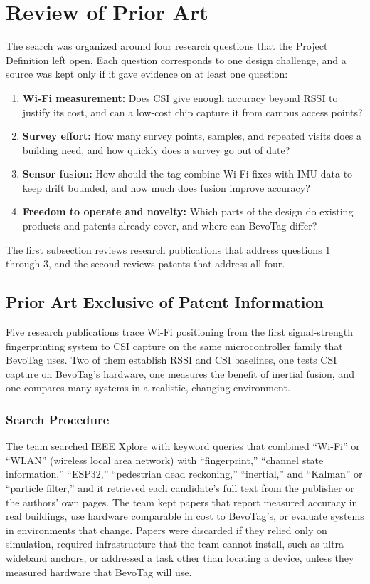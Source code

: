\documentclass[12pt,letterpaper]{article}
\begin{document}
\section{Review of Prior Art}
The search was organized around four research questions that the Project Definition left open.
Each question corresponds to one design challenge, and a source was kept only if it gave evidence
on at least one question:
\begin{enumerate}
  \item \textbf{Wi-Fi measurement:} Does CSI give enough accuracy beyond RSSI to justify its cost,
    and can a low-cost chip capture it from campus access points?
  \item \textbf{Survey effort:} How many survey points, samples, and repeated visits does a
    building need, and how quickly does a survey go out of date?
  \item \textbf{Sensor fusion:} How should the tag combine Wi-Fi fixes with IMU data to keep
    drift bounded, and how much does fusion improve accuracy?
  \item \textbf{Freedom to operate and novelty:} Which parts of the design do existing products
    and patents already cover, and where can BevoTag differ?
\end{enumerate}
The first subsection reviews research publications that address questions 1 through 3, and the
second reviews patents that address all four.

\subsection{Prior Art Exclusive of Patent Information}
Five research publications trace Wi-Fi positioning from the first signal-strength fingerprinting
system to CSI capture on the same microcontroller family that BevoTag uses. Two of them establish
RSSI and CSI baselines, one tests CSI capture on BevoTag's hardware, one measures the benefit of
inertial fusion, and one compares many systems in a realistic, changing environment.

\subsubsection{Search Procedure}
The team searched IEEE Xplore with keyword queries that combined ``Wi-Fi'' or ``WLAN'' (wireless
local area network) with ``fingerprint,'' ``channel state information,'' ``ESP32,'' ``pedestrian
dead reckoning,'' ``inertial,'' and ``Kalman'' or ``particle filter,'' and it retrieved each
candidate's full text from the publisher or the authors' own pages. The team kept papers that
report measured accuracy in real buildings, use hardware comparable in cost to BevoTag's, or
evaluate systems in environments that change. Papers were discarded if they relied only on simulation, required
infrastructure that the team cannot install, such as ultra-wideband anchors, or addressed a task
other than locating a device, unless they measured hardware that BevoTag will use.
\end{document}
